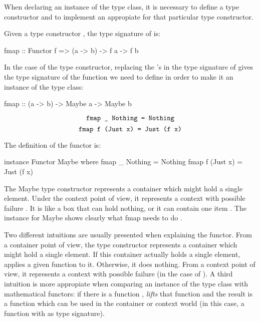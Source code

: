 \begin{example}
  \label{ex:functor-maybe-haskell}

  When declaring an instance of the  type class, it is
  necessary to define a type constructor and to implement an
  appropiate  for that particular type constructor.

  Given a type constructor , the type signature of
   is:
  \begin{codehaskell}
fmap :: Functor f => (a -> b) -> f a -> f b
  \end{codehaskell}
  In the case of the  type constructor, replacing the
  's in the type signature of  gives the type
  signature of the function we need to define in order to make it an
  instance of the  type class:
  \begin{codehaskell}
fmap :: (a -> b) -> Maybe a -> Maybe b
  \end{codehaskell}

  \begin{equation}
    \label{eq:maybe-fmap-nothing}
    \text{\texttt{fmap \_ Nothing = Nothing}}
  \end{equation}
  \begin{equation}
    \label{eq:maybe-fmap-just}
    \text{\texttt{fmap f (Just x) = Just (f x)}}
  \end{equation}

  The definition of the  functor is:

  \begin{codehaskell}
instance Functor Maybe where
  fmap _ Nothing  = Nothing
  fmap f (Just x) = Just (f x)
  \end{codehaskell}

The Maybe type constructor represents a container which might hold a
single element. Under the context point of view, it represents a
context with possible failure \parencite{yorgey-2009}. It is like a box
that can hold nothing, or it can contain one item
\parencite{lipovaca-2011}. The instance for Maybe shows
clearly what fmap needs to do \parencite{osullivan-2008}.

Two different intuitions are usually presented when explaining the
 functor. From a container point of view, the
 type constructor represents a container which might
hold a single element. If this container actually holds a single
element,  applies a given function to it. Otherwise, it
does nothing. From a context point of view, it represents a context
with possible failure (in the case of ). A third
intuition is more appropiate when comparing an instance of the
 type class with mathematical functors: if there is a
function ,  \emph{lifts} that
function and the result is a function which can be used in the
container or context world (in this case, a function with  as type signature).


\end{example}
